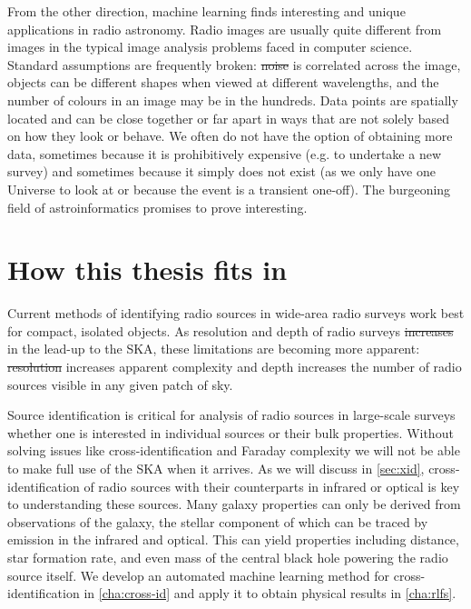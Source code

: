 \documentclass[11pt, a4paper]{book}
\providecommand{\DIFaddtex}[1]{{\protect\color{blue}\uwave{#1}}} %
\providecommand{\DIFdeltex}[1]{{\protect\color{red}\sout{#1}}}                      %
\providecommand{\DIFaddbegin}{} %
\providecommand{\DIFaddend}{} %
\providecommand{\DIFdelbegin}{} %
\providecommand{\DIFdelend}{} %
\providecommand{\DIFadd}[1]{\texorpdfstring{\DIFaddtex{#1}}{#1}} %
\providecommand{\DIFdel}[1]{\texorpdfstring{\DIFdeltex{#1}}{}} %
\newcommand{\DIFscaledelfig}{0.5}
\newlength{\DIFdelgraphicswidth} %
\newlength{\DIFdelgraphicsheight} %
\newcommand{\DIFaddincludegraphics}[2][]{{\color{blue}\fbox{\DIFOincludegraphics[#1]{#2}}}} %
\newcommand{\DIFdelincludegraphics}[2][]{%
\sbox{\DIFdelgraphicsbox}{\DIFOincludegraphics[#1]{#2}}%
\settoboxwidth{\DIFdelgraphicswidth}{\DIFdelgraphicsbox} %
\settoboxtotalheight{\DIFdelgraphicsheight}{\DIFdelgraphicsbox} %
\scalebox{\DIFscaledelfig}{%
\parbox[b]{\DIFdelgraphicswidth}{\usebox{\DIFdelgraphicsbox}\\[-\baselineskip] \rule{\DIFdelgraphicswidth}{0em}}\llap{\resizebox{\DIFdelgraphicswidth}{\DIFdelgraphicsheight}{%
\setlength{\unitlength}{\DIFdelgraphicswidth}%
\begin{picture}(1,1)%
\thicklines\linethickness{2pt} %
{\color[rgb]{1,0,0}\put(0,0){\framebox(1,1){}}}%
{\color[rgb]{1,0,0}\put(0,0){\line( 1,1){1}}}%
{\color[rgb]{1,0,0}\put(0,1){\line(1,-1){1}}}%
\end{picture}%
}\hspace*{3pt}}} %
} %
\DeclareRobustCommand{\DIFaddbegin}{\DIFOaddbegin \let\includegraphics\DIFaddincludegraphics} %
\DeclareRobustCommand{\DIFaddend}{\DIFOaddend \let\includegraphics\DIFOincludegraphics} %
\DeclareRobustCommand{\DIFdelbegin}{\DIFOdelbegin \let\includegraphics\DIFdelincludegraphics} %
\DeclareRobustCommand{\DIFdelend}{\DIFOaddend \let\includegraphics\DIFOincludegraphics} %
\begin{document}
    From the other direction, machine learning finds interesting and unique applications in radio astronomy. Radio images are usually quite different from images in the typical image analysis problems faced in computer science. Standard assumptions are frequently broken: \DIFdelbegin \DIFdel{noise }\DIFdelend \DIFaddbegin \DIFadd{Noise }\DIFaddend is correlated across the image, objects can be different shapes when viewed at different wavelengths, and the number of colours in an image may be in the hundreds. Data points are spatially located and can be close together or far apart in ways that are not solely based on how they look or behave. We often do not have the option of obtaining more data, sometimes because it is prohibitively expensive (e.g. to undertake a new survey) and sometimes because it simply does not exist (as we only have one Universe to look at or because the event is a transient one-off). The burgeoning field of astroinformatics promises to prove interesting.

\section{How this thesis fits in}
\label{sec:how-this-fits}

    Current methods of identifying radio sources in wide-area radio surveys work best for compact, isolated objects. As resolution and depth of radio surveys \DIFdelbegin \DIFdel{increases }\DIFdelend \DIFaddbegin \DIFadd{increase }\DIFaddend in the lead-up to the SKA, these limitations are becoming more apparent: \DIFdelbegin \DIFdel{resolution }\DIFdelend \DIFaddbegin \DIFadd{Resolution }\DIFaddend increases apparent complexity and depth increases the number of radio sources visible in any given patch of sky.

    Source identification is critical for analysis of radio sources in large-scale surveys whether one is interested in individual sources or their bulk properties. Without solving issues like cross-identification and Faraday complexity we will not be able to make full use of the SKA when it arrives. As we will discuss in \autoref{sec:xid}, cross-identification of radio sources with their counterparts in infrared or optical is key to understanding these sources. Many \DIFaddbegin \DIFadd{radio }\DIFaddend galaxy properties can only be derived from \DIFaddbegin \DIFadd{non-radio }\DIFaddend observations of the galaxy, the stellar component of which can be traced by emission in the infrared and optical. This can yield properties including distance, star formation rate, and even mass of the central black hole powering the radio source itself. We develop an automated machine learning method for cross-identification in \autoref{cha:cross-id} and apply it to obtain physical results in \autoref{cha:rlfs}.
\end{document}
